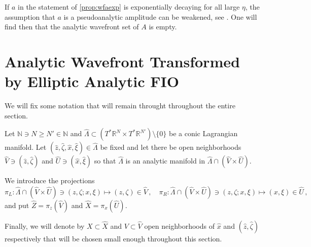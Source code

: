 \documentclass[
	fontsize=11pt, 
	twoside=false, 
	abstract=true, 
	a4paper,
]{scrartcl}
\newcommand{\sem}{\setminus\{0\}}
\newcommand{\RR}{\mathbb{R}}
\newcommand{\abs}[1]{\left\lvert#1\right\rvert}
\begin{document}
\begin{remark}
If $a$ in the statement of \cref{prop:wfaexp} is exponentially decaying for all large $\eta$, the assumption that $a$ is a pseudoanalytic amplitude can be weakened, see \cite[Prop.~17.1.19]{MR4436039}. One will find then that the analytic wavefront set of $A$ is empty. 
\end{remark}


\section{Analytic Wavefront Transformed by Elliptic Analytic FIO}\label{sec:2}

%
%

We will fix some notation that will remain throught throughout the entire section. 

Let $\mathbb{N} \ni N \geq N' \in \mathbb{N}$ and $\hat\Lambda \subset (T^\ast \RR^N \times T^\ast \RR^{N'})\sem$ be a conic Lagrangian manifold. %
Let $(\hat z, \hat \zeta, \hat x, \hat \xi) \in \hat\Lambda$ be fixed and let there be open neighborhoods $\hat V \ni (\hat z, \hat \zeta)$ and $\hat U \ni (\hat x, \hat \xi)$ so that $\hat\Lambda$ is an analytic manifold in $\hat\Lambda \cap (\hat V\times \hat U)$.  

We introduce the projections
\[
	\pi_L \colon \hat\Lambda \cap (\hat V\times \hat U) \ni (z,\zeta;x,\xi) \mapsto (z,\zeta) \in \hat V\,,\quad \pi_R \colon \hat\Lambda \cap (\hat V\times \hat U) \ni (z,\zeta;x,\xi) \mapsto (x,\xi) \in \hat U\,,
\]
and put $\hat Z = \pi_z(\hat V)$ and $\hat X = \pi_x(\hat U)$. 

Finally, we will denote by $X\subset \hat X$ and $V \subset \hat V$ open neighborhoods of $\hat x$ and $(\hat z,\hat \zeta)$ respectively that will be chosen small enough throughout this section.
\end{document}
